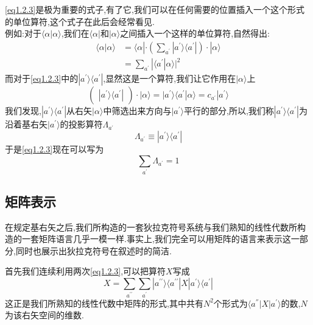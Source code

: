 \documentclass[lang=cn,newtx,10pt,scheme=chinese,thmcnt=section]{elegantbook}
\begin{document}
\ref{eq1.2.3}是极为重要的式子,有了它,我们可以在任何需要的位置插入一个这个形式的单位算符,这个式子在此后会经常看见.\\
例如:对于$\langle\alpha|\alpha\rangle$,我们在$\langle\alpha|$和$|\alpha\rangle$之间插入一个这样的单位算符,自然得出:
\begin{equation}
	\begin{aligned}
		\langle\alpha|\alpha\rangle&=\langle\alpha|\cdot(\sum_{a^{\prime}}|a^{\prime}\rangle\langle a^{\prime}|)\cdot|\alpha\rangle\\&=\sum_{a^{\prime}}|\langle a^{\prime}|\alpha\rangle|^2
	\end{aligned}
\end{equation}
而对于\ref{eq1.2.3}中的$|a^{\prime}\rangle\langle a^{\prime}|$,显然这是一个算符,我们让它作用在$|\alpha\rangle$上
\begin{equation}
	(\begin{array}{c}|a^{\prime}\rangle\langle a^{\prime}|\end{array})\cdot|\alpha\rangle=|a^{\prime}\rangle\langle a^{\prime}|\alpha\rangle=c_{a^{\prime}}|a^{\prime}\rangle 
\end{equation}
我们发现,$|a^{\prime}\rangle\langle a^{\prime}|$从右矢$|\alpha\rangle$中筛选出来方向与$|a^{'}\rangle$平行的部分,所以,我们称$|a^{\prime}\rangle\langle a^{\prime}|$为沿着基右矢$|a^{'}\rangle$的投影算符$\Lambda_{a^{\prime}}$\
\begin{equation}
	\Lambda_{a^{\prime}}\equiv| a^{\prime}\rangle\langle a^{\prime}| 
\end{equation}
于是\ref{eq1.2.3}现在可以写为
\begin{equation}
	\sum_{a^{\prime}}\Lambda_{a^{\prime}}=1
\end{equation}
\subsection*{矩阵表示}
在规定基右矢之后,我们所构造的一套狄拉克符号系统与我们熟知的线性代数所构造的一套矩阵语言几乎一模一样.事实上,我们完全可以用矩阵的语言来表示这一部分,同时也展示出狄拉克符号在叙述时的简洁.

首先我们连续利用两次\ref{eq1.2.3},可以把算符$X$写成
\begin{equation}
X=\sum_{a^{\prime\prime}}\sum_{a^{\prime}}|a^{\prime\prime}\rangle\langle a^{\prime\prime}|X|a^{\prime}\rangle\langle a^{\prime}|
\end{equation}
这正是我们所熟知的线性代数中矩阵的形式,其中共有$N^2$个形式为$\langle a^{''}|X|a^{'}\rangle$的数,$N$为该右矢空间的维数.
\end{document}

